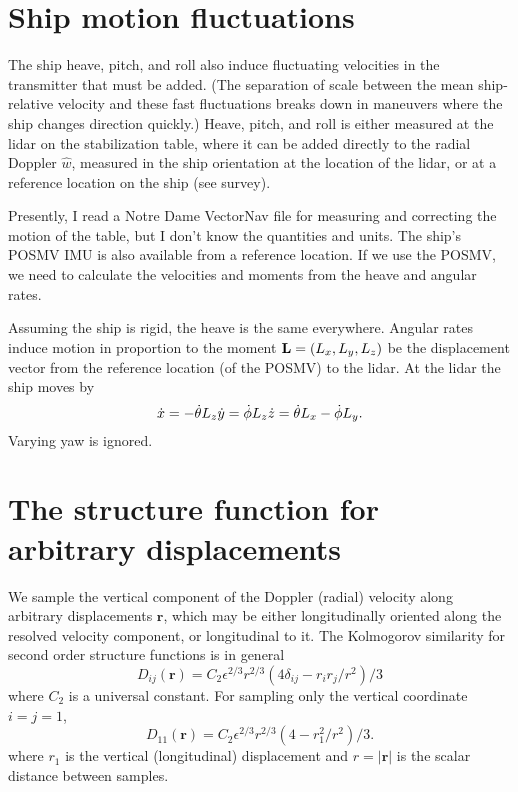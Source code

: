 \documentclass[12pt]{article}
\begin{document}
\section{Ship motion fluctuations}\label{ship-motion-fluctuations}%

The ship heave, pitch, and roll also induce fluctuating velocities in
the transmitter that must be added. (The separation of scale between the
mean ship-relative velocity and these fast fluctuations breaks down in
maneuvers where the ship changes direction quickly.) Heave, pitch, and
roll is either measured at the lidar on the stabilization table, where
it can be added directly to the radial Doppler \(\hat w\), measured in
the ship orientation at the location of the lidar, or at a reference
location on the ship (see survey).

Presently, I read a Notre Dame VectorNav file for measuring and
correcting the motion of the table, but I don't know the quantities and
units. The ship's POSMV IMU is also available from a reference location.
If we use the POSMV, we need to calculate the velocities and moments
from the heave and angular rates.

Assuming the ship is rigid, the heave is the same everywhere. Angular
rates induce motion in proportion to the moment
\({\bf L} = (L_x, L_y, L_z)\) be the displacement vector from the
reference location (of the POSMV) to the lidar. At the lidar the ship
moves by \[
\dot{x} = -\dot\theta L_z\\
\dot{y} = \dot\phi L_z\\
\dot{z} = \dot\theta L_x - \dot\phi L_y.
\] 
Varying yaw is ignored.

\section{The structure function for arbitrary displacements}

We sample the vertical component of the Doppler (radial) velocity along
arbitrary displacements \(\mathbf{r}\), which may be either longitudinally oriented
along the resolved velocity component, or longitudinal to it. The Kolmogorov 
similarity for second order structure functions is in general
\[
D_{ij}(\mathbf{r}) = C_2 \epsilon^{2/3}r^{2/3} (4\delta_{ij} - r_ir_j/r^2)/3
\]
where \(C_2\) is a universal constant.
For sampling only the vertical coordinate \(i=j=1\),
\[
D_{11}(\mathbf{r}) = C_2 \epsilon^{2/3} r^{2/3} (4 - r_1^2/r^2)/3.
\]
where \(r_1\) is the vertical (longitudinal) displacement and \(r = |\mathbf{r}|\) is the scalar
distance between samples.
\end{document}
